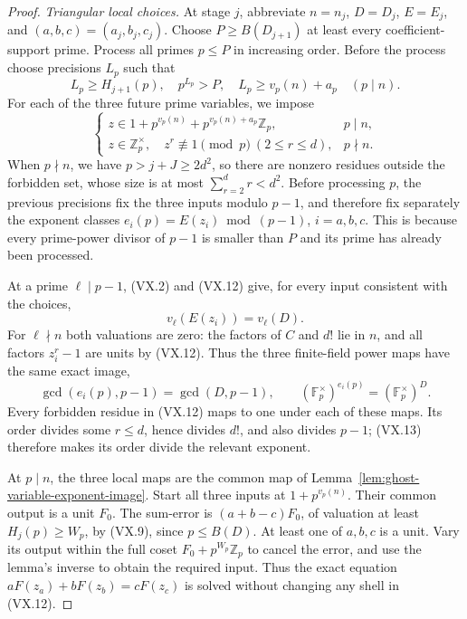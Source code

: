 \begin{proof}
\emph{Triangular local choices.}
At stage \(j\), abbreviate \(n=n_j\),
\(D=D_j\), \(E=E_j\), and \((a,b,c)=(a_j,b_j,c_j)\).
Choose \(P\ge B(D_{j+1})\) at least every
coefficient-support prime. Process all primes
\(p\le P\) in increasing order. Before the
process choose precisions \(L_p\) such that
\[
 L_p\ge H_{j+1}(p),\quad p^{L_p}>P,
 \quad L_p\ge v_p(n)+a_p\quad(p\mid n).
 \tag{VX.11}
\]
For each of the three future prime variables,
we impose
\[
 \begin{cases}
 z\in1+p^{v_p(n)}+p^{v_p(n)+a_p}\mathbb Z_p,
                                      &p\mid n,\\
 z\in\mathbb Z_p^\times,\quad
 z^r\not\equiv1\pmod p\ (2\le r\le d),
                                      &p\nmid n.
 \end{cases}
 \tag{VX.12}
\]
When \(p\nmid n\), we have \(p>j+J\ge2d^2\),
so there are nonzero residues outside the forbidden
set, whose size is at most \(\sum_{r=2}^d r<d^2\).
Before processing \(p\), the previous precisions
fix the three inputs modulo \(p-1\), and therefore
fix separately the exponent classes
\(e_i(p)=E(z_i)\bmod(p-1)\), \(i=a,b,c\).
This is because every prime-power divisor of
\(p-1\) is smaller than \(P\) and its prime has
already been processed.

At a prime \(\ell\mid p-1\), (VX.2) and (VX.12)
give, for every input consistent with the choices,
\[
 v_\ell(E(z_i))=v_\ell(D).
\]
For \(\ell\nmid n\) both valuations are zero:
the factors of \(C\) and \(d!\) lie in \(n\),
and all factors \(z_i^r-1\) are units by (VX.12).
Thus the three finite-field power maps have
the same exact image,
\[
 \gcd(e_i(p),p-1)=\gcd(D,p-1),\qquad
 (\mathbb F_p^\times)^{e_i(p)}
                  =(\mathbb F_p^\times)^D.
 \tag{VX.13}
\]
Every forbidden residue in (VX.12) maps to one
under each of these maps. Its order divides
some \(r\le d\), hence divides \(d!\), and
also divides \(p-1\); (VX.13) therefore makes
its order divide the relevant exponent.

At \(p\mid n\), the three local maps are
the common map of Lemma~\ref{lem:ghost-variable-exponent-image}.
Start all three inputs at \(1+p^{v_p(n)}\).
Their common output is a unit \(F_0\).
The sum-error is \((a+b-c)F_0\), of valuation
at least \(H_j(p)\ge W_p\), by (VX.9), since
\(p\le B(D)\). At least one of \(a,b,c\)
is a unit. Vary its output within the full
coset \(F_0+p^{W_p}\mathbb Z_p\) to cancel
the error, and use the lemma's inverse to
obtain the required input. Thus the exact
equation \(aF(z_a)+bF(z_b)=cF(z_c)\) is solved
without changing any shell in (VX.12).


\end{proof}
